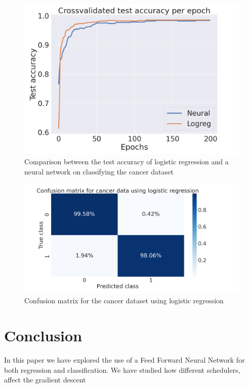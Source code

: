 \documentclass[onecolumn,10pt,cleanfoot]{asme2ej}
\begin{document}
\begin{figure}[h]
\centerline{\includegraphics[width=5in]{figure/cancerlogneur.png}}
\caption{Comparison between the test accuracy of logistic regression and a neural network on classifying the cancer dataset}
\label{cancerlogneur}
\end{figure}

\begin{figure}[h]
\centerline{\includegraphics[width=5in]{figure/cancerconflog.png}}
\caption{Confusion matrix for the cancer dataset using logistic regression}
\label{cancerconflog}
\end{figure}

\section{Conclusion}

In this paper we have explored the use of a Feed Forward Neural Network for both regression and classification. We have studied how different schedulers, affect the gradient descent



\end{document}
